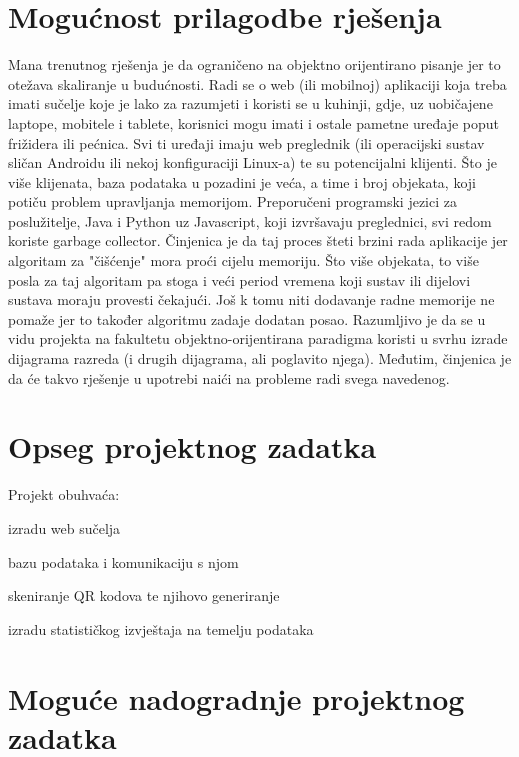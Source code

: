 	\section{Mogućnost prilagodbe rješenja}
	Mana trenutnog rješenja je da ograničeno na objektno orijentirano pisanje jer to otežava skaliranje u budućnosti. Radi se o web (ili mobilnoj) aplikaciji koja treba imati sučelje koje je lako za razumjeti i koristi se u kuhinji, gdje, uz uobičajene laptope, mobitele i tablete, korisnici mogu imati i ostale pametne uređaje poput frižidera ili pećnica. Svi ti uređaji imaju web preglednik (ili operacijski sustav sličan Androidu ili nekoj konfiguraciji Linux-a) te su potencijalni klijenti. Što je više klijenata, baza podataka u pozadini je veća, a time i broj objekata, koji potiču problem upravljanja memorijom. Preporučeni programski jezici za poslužitelje, Java i Python uz Javascript, koji izvršavaju preglednici, svi redom koriste garbage collector. Činjenica je da taj proces šteti brzini rada aplikacije jer algoritam za "čišćenje" mora proći cijelu memoriju. Što više objekata, to više posla za taj algoritam pa stoga i veći period vremena koji sustav ili dijelovi sustava moraju provesti čekajući. Još k tomu niti dodavanje radne memorije ne pomaže jer to također algoritmu zadaje dodatan posao. Razumljivo je da se u vidu projekta na fakultetu objektno-orijentirana paradigma koristi u svrhu izrade dijagrama razreda (i drugih dijagrama, ali poglavito njega). Međutim, činjenica je da će takvo rješenje u upotrebi naići na probleme radi svega navedenog.

	\section{Opseg projektnog zadatka}
	Projekt obuhvaća:
	\begin{packed_item}
 		\item izradu web sučelja
		\item bazu podataka i komunikaciju s njom
		\item skeniranje QR kodova te njihovo generiranje
		\item izradu statističkog izvještaja na temelju podataka
	\end{packed_item}

	\section{Moguće nadogradnje projektnog zadatka}
